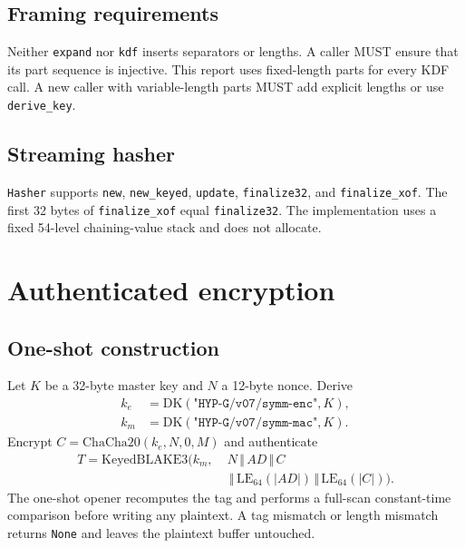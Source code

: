 \documentclass[runningheads]{llncs}
\newcommand{\concat}{\,\Vert\,}
\begin{document}
\subsection{Framing requirements}

Neither \texttt{expand} nor \texttt{kdf} inserts separators or lengths.
A caller MUST ensure that its part sequence is injective.  This report
uses fixed-length parts for every KDF call.  A new caller with
variable-length parts MUST add explicit lengths or use
\texttt{derive\_key}.

\subsection{Streaming hasher}

\texttt{Hasher} supports \texttt{new}, \texttt{new\_keyed},
\texttt{update}, \texttt{finalize32}, and \texttt{finalize\_xof}.  The
first 32 bytes of \texttt{finalize\_xof} equal \texttt{finalize32}.
The implementation uses a fixed 54-level chaining-value stack and does
not allocate.

\section{Authenticated encryption}
\label{sec:aead}

\subsection{One-shot construction}

Let $K$ be a 32-byte master key and $N$ a 12-byte nonce.  Derive
\[
\begin{aligned}
 k_e&=\mathrm{DK}(\texttt{"HYP-G/v07/symm-enc"},K),\\
 k_m&=\mathrm{DK}(\texttt{"HYP-G/v07/symm-mac"},K).
\end{aligned}
\]
Encrypt $C=\mathrm{ChaCha20}(k_e,N,0,M)$ and authenticate
\[
\begin{aligned}
 T=\mathrm{KeyedBLAKE3}\bigl(k_m,\;&
 N\concat AD\concat C\\
 &\concat\mathrm{LE}_{64}(|AD|)
 \concat\mathrm{LE}_{64}(|C|)\bigr).
\end{aligned}
\]
The one-shot opener recomputes the tag and performs a full-scan
constant-time comparison before writing any plaintext.  A tag mismatch
or length mismatch returns \texttt{None} and leaves the plaintext buffer
untouched.
\end{document}
